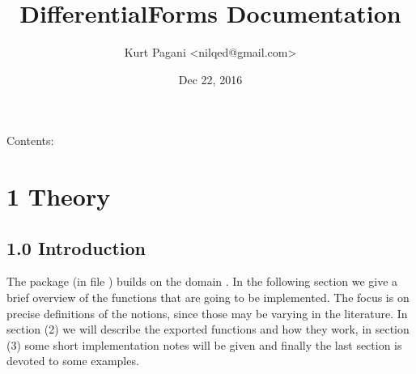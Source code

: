 \documentclass[letterpaper,10pt,english]{sphinxmanual}
\title{DifferentialForms Documentation}
\date{Dec 22, 2016}
\author{Kurt Pagani \textless{}nilqed@gmail.com\textgreater{}}
\begin{document}
\maketitle
\tableofcontents
{}\label{index::doc}


Contents:


\chapter{1 Theory}
\label{section-1.0:introduction}\label{section-1.0:fricas-differentialforms}\label{section-1.0::doc}\label{section-1.0:theory}

\section{1.0 Introduction}
\label{section-1.0:id1}
The package  (in file ) builds on the
domain . In the following section we give a brief overview
of the functions that are going to be implemented. The focus is on precise
definitions of the notions, since those may be varying in the literature.
In section (2) we will describe the exported functions and how they work,
in section (3) some short implementation notes will be given and finally
the last section is devoted to some examples.
\end{document}

